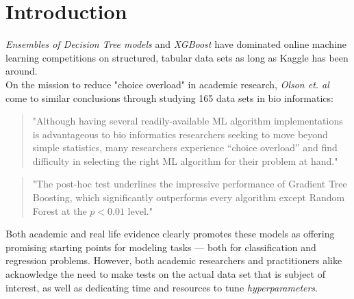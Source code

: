 \documentclass[10pt, a4paper, twocolumn]{article}
\begin{document}

\twocolumn[
\begin{@twocolumnfalse}
	\maketitle
	\begin{abstract}
		\abstractText
		\newline
		\newline
	\end{abstract}
\end{@twocolumnfalse}
]


\section{Introduction}
	\emph{Ensembles of Decision Tree models} and \emph{XGBoost} have dominated online machine learning competitions on structured, tabular data sets as long as Kaggle has been around\cite{ceoKaggle}. \\
	On the mission to reduce "choice overload" in academic research, \emph{Olson et. al} come to similar conclusions through studying 165 data sets in bio informatics:\\
		\begin{quote} 
			\centering 
				"Although having several readily-available ML algorithm implementations is advantageous to bio informatics researchers seeking to move beyond simple statistics, many researchers experience “choice overload” and find difficulty in selecting the right ML algorithm for their problem at hand." \cite{useGradientBoosting}
		\end{quote}
		\begin{quote} 
			\centering 
				"The post-hoc test underlines the impressive performance of Gradient Tree Boosting, which significantly outperforms every algorithm except Random Forest at the $p < 0.01$ level." \cite{useGradientBoosting}
		\end{quote}
	Both academic and real life evidence clearly promotes these models as offering promising starting points for modeling tasks --- both for classification and regression problems. However, both academic researchers and practitioners alike acknowledge the need to make tests on the actual data set that is subject of interest, as well as dedicating time and resources to tune \emph{hyperparameters}\cite{useGradientBoosting}.\\\\	
\end{document}
